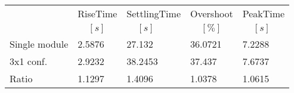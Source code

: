 \begin{tabular}{lllll}
 & RiseTime & SettlingTime & Overshoot & PeakTime \\ 
 & $\;\;\;\;[s]$ & $\;\;\;\;[s]$ & $\;\;\;\;[\%]$ & $\;\;\;\;[s]$ \\ 
\hline 
Single module & 2.5876 & 27.132 & 36.0721 & 7.2288 \\
3x1 conf. & 2.9232 & 38.2453 & 37.437 & 7.6737 \\[10pt] \hline 
Ratio & 1.1297 & 1.4096 & 1.0378 & 1.0615 \\ 
\end{tabular}